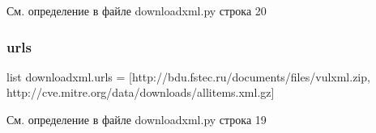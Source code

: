 См. определение в файле downloadxml.\+py строка 20

\mbox{\label{namespacedownloadxml_a89324d9cb91e8b04605a33cb8a959ac9}} 
\subsubsection{\texorpdfstring{urls}{urls}}
{\footnotesize\ttfamily list downloadxml.\+urls = \mbox{[}\textquotesingle{}http\+://bdu.\+fstec.\+ru/documents/files/vulxml.\+zip\textquotesingle{}, \textquotesingle{}http\+://cve.\+mitre.\+org/data/downloads/allitems.\+xml.\+gz\textquotesingle{}\mbox{]}}



См. определение в файле downloadxml.\+py строка 19

